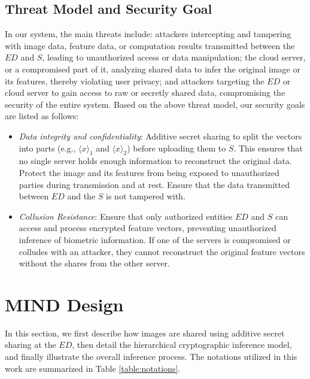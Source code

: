 \documentclass[conference]{IEEEtran}
\begin{document}
\subsection{Threat Model and Security Goal}
In our system, the main threats include: attackers intercepting and tampering with image data, feature data, or computation results transmitted between the $ED$ and $S$, leading to unauthorized access or data manipulation; the cloud server, or a compromised part of it, analyzing shared data to infer the original image or its features, thereby violating user privacy; and attackers targeting the $ED$ or cloud server to gain access to raw or secretly shared data, compromising the security of the entire system. Based on the above threat model, our security goals are listed as follows:
\begin{itemize}
     \item \textit{Data integrity and confidentiality}: Additive secret sharing to split the vectors into parts (e.g., $\langle x \rangle_1$ and $\langle x \rangle_2$) before uploading them to $S$. This ensures that no single server holds enough information to reconstruct the original data. Protect the image and its features from being exposed to unauthorized parties during transmission and at rest. Ensure that the data transmitted between $ED$ and the $S$ is not tampered with. 
     \item \textit{Collusion Resistance}: Ensure that only authorized entities $ED$ and $S$ can access and process encrypted feature vectors, preventing unauthorized inference of biometric information. If one of the servers is compromised or colludes with an attacker, they cannot reconstruct the original feature vectors without the shares from the other server.
 \end{itemize}
 
\section{MIND Design}
In this section, we first describe how images are shared using additive secret sharing at the $ED$, then detail the hierarchical cryptographic inference model, and finally illustrate the overall inference process. The notations utilized in this work are summarized in Table \ref{table:notations}.
\end{document}
